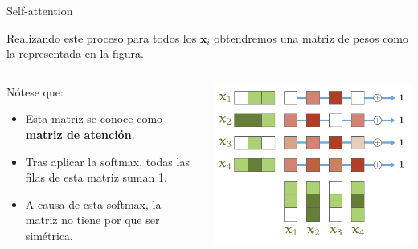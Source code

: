 \documentclass[aspectratio=169]{beamer}
\newenvironment{blockm}[1]{%
  \begin{block}{\textbf{#1}}%
  }{%
  \end{block}%
  \vspace{1em}%
}
\begin{document}
\begin{frame}{Self-attention}

  Realizando este proceso para todos los $\mathbf{x}_{i}$ obtendremos una matriz de pesos como la representada en la figura.\\

  \begin{columns}
    
    \begin{column}{0.5\textwidth}
      Nótese que:
      \begin{itemize}
        \item Esta matriz se conoce como \textbf{matriz de atención}.
        \item Tras aplicar la softmax, todas las filas de esta matriz suman 1.
        \item A causa de esta softmax, la matriz no tiene por que ser simétrica. 
      \end{itemize}
    \end{column}

    \begin{column}{0.5\textwidth}
      \includegraphics[width=.9\textwidth, center]{imgs/tema4/att/SAT_mtx.pdf}
    \end{column}

  \end{columns}

\end{frame}

\end{document}
